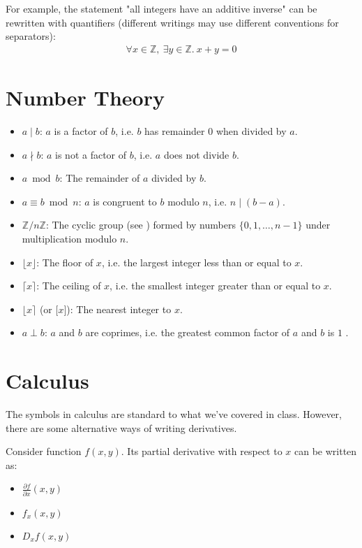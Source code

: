 \documentclass[12pt]{article}
\theoremstyle{definition}
\newcommand{\bras}[1]{\lbrace #1 \rbrace}
\begin{document}
  	For example, the statement "all integers have an additive inverse" can be rewritten with quantifiers (different writings may use different conventions for separators):
  	\begin{gather*}
  		\forall x \in \mathbb{Z},\ \exists y \in \mathbb{Z}.\ x + y = 0
  	\end{gather*}
 	
 	\section{Number Theory}
 	
 	\begin{itemize}
 		\item $a \mid b$: $a$ is a factor of $b$, i.e. $b$ has remainder $0$ when divided by $a$.
 		\item $a \nmid b$: $a$ is not a factor of $b$, i.e. $a$ does not divide $b$.
 		\item $a \bmod b$: The remainder of $a$ divided by $b$.
 		\item $a \equiv b \bmod n$: $a$ is congruent to $b$ modulo $n$, i.e. $n \mid (b - a)$.
 		\item $\mathbb{Z}/n\mathbb{Z}$: The cyclic group (see ) formed by numbers $\bras{0, 1, \dots, n - 1}$ under multiplication modulo $n$.
 		\item $\lfloor x \rfloor$: The floor of $x$, i.e. the largest integer less than or equal to $x$.
 		\item $\lceil x \rceil$: The ceiling of $x$, i.e. the smallest integer greater than or equal to $x$.
 		\item $\lfloor x \rceil$ (or $\lbrack x \rbrack$): The nearest integer to $x$.
 		\item $a \perp b$: $a$ and $b$ are coprimes, i.e. the greatest common factor of $a$ and $b$ is $1$
. 	\end{itemize}
 	
 	\section{Calculus}
 	
 	The symbols in calculus are standard to what we've covered in class. However, there are some alternative ways of writing derivatives.
 	
 	Consider function $f(x, y)$. Its partial derivative with respect to $x$ can be written as:
 	\begin{itemize}
 		\item $\frac{\partial f}{\partial x}(x, y)$
 		\item $f_x(x, y)$
 		\item $D_xf(x, y)$
 	\end{itemize}
 	
\end{document}
